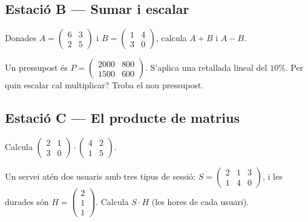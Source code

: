 \subsection{Estació B — Sumar i escalar}

\begin{exercicis}[Estació B]
\begin{exlist}
  \item Donades $A=\begin{pmatrix} 6 & 3 \\ 2 & 5 \end{pmatrix}$ i
        $B=\begin{pmatrix} 1 & 4 \\ 3 & 0 \end{pmatrix}$, calcula $A+B$ i $A-B$.
  \item Un pressupost és $P=\begin{pmatrix} 2000 & 800 \\ 1500 & 600 \end{pmatrix}$.
        S'aplica una retallada lineal del $10\%$. Per quin escalar cal multiplicar?
        Troba el nou pressupost.
\end{exlist}
\end{exercicis}

\subsection{Estació C — El producte de matrius}

\begin{exercicis}[Estació C]
\begin{exlist}
  \item Calcula $\begin{pmatrix} 2 & 1 \\ 3 & 0 \end{pmatrix}\cdot\begin{pmatrix} 4 & 2 \\ 1 & 5 \end{pmatrix}$.
  \item Un servei atén dos usuaris amb tres tipus de sessió:
        $S=\begin{pmatrix} 2 & 1 & 3 \\ 1 & 4 & 0 \end{pmatrix}$, i les durades són
        $H=\begin{pmatrix} 2 \\ 1 \\ 1 \end{pmatrix}$. Calcula $S\cdot H$ (les hores
        de cada usuari).
\end{exlist}
\end{exercicis}

